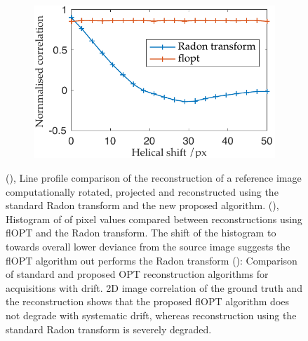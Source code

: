 \documentclass{osa-article}
\begin{document}
\begin{figure}
\begin{subfigure}[t]{0.45\textwidth}
    \caption{}\label{fig:flopt_histogram}
  \end{subfigure}\\
  \begin{subfigure}[t]{0.45\textwidth}
    \centering
    \includegraphics[width=\textwidth]{./figures/results/correlation_helicity}
    \caption{}\label{fig:helical_comparison}
  \end{subfigure}
  \caption{
  (), Line profile comparison of the reconstruction of a reference image computationally rotated, projected and reconstructed using the standard \gls{Radon transform} and the new proposed algorithm.
  (), Histogram of of pixel values compared between reconstructions using flOPT and the \gls{Radon transform}.
  The shift of the histogram to towards overall lower deviance from the source image suggests the flOPT algorithm out performs the \gls{Radon transform}
  (): Comparison of standard and proposed \gls{OPT} reconstruction algorithms for acquisitions with drift.
  2D image correlation of the ground truth and the reconstruction shows that the proposed flOPT algorithm does not degrade with systematic drift, whereas reconstruction using the standard \gls{Radon transform} is severely degraded.}
\end{figure}
\end{document}
